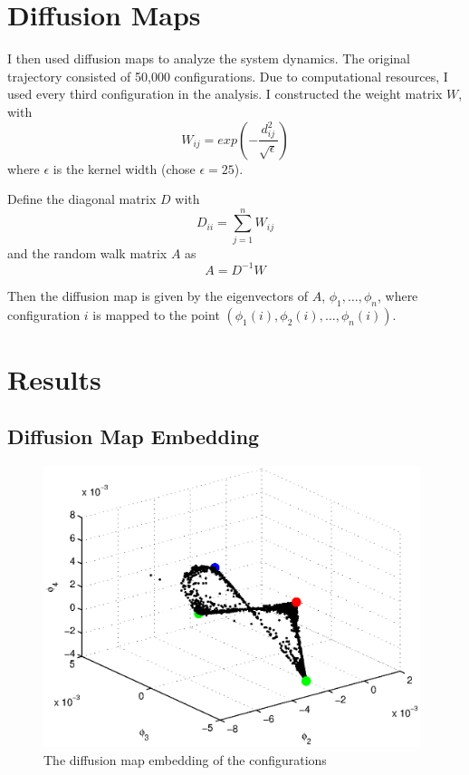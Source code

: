 \section{Diffusion Maps}
I then used diffusion maps to analyze the system dynamics. The original trajectory consisted of 50,000 configurations. Due to computational resources, I used every third configuration in the analysis. I constructed the weight matrix $W$, with
$$W_{ij}=exp\left(-\frac{d_{ij}^2}{\sqrt{\epsilon}}\right)$$
where $\epsilon$ is the kernel width (chose $\epsilon=25$). 

Define the diagonal matrix $D$ with
$$D_{ii}=\sum_{j=1}^{n}W_{ij}$$
and the random walk matrix $A$ as
$$A=D^{-1}W$$

Then the diffusion map is given by the eigenvectors of $A$, $\phi_{1},\dots,\phi_{n}$, where configuration $i$ is mapped to the point $(\phi_{1}(i),\phi_{2}(i),\dots,\phi_{n}(i))$.

\section{Results}

\subsection{Diffusion Map Embedding}

\begin{figure}[t]
\includegraphics[width=11cm]{dmap}
\caption[Diffusion maps embedding of Lennard-Jones cluster]{The diffusion map embedding of the configurations}
\label{dmap}
\end{figure}

